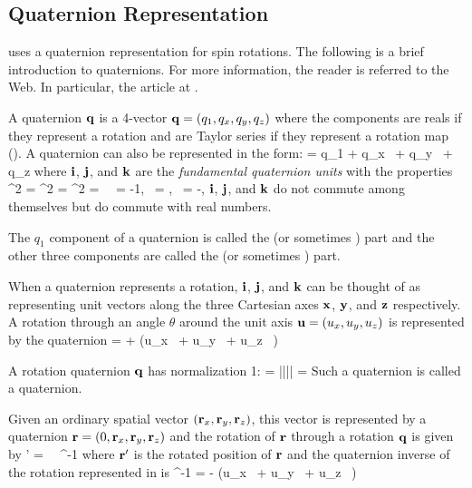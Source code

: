 \subsection{Quaternion Representation}
\label{s:quat}

\bmad uses a quaternion representation for spin rotations. The following is a brief introduction to
quaternions. For more information, the reader is referred to the Web. In particular, the
 article at . 

A quaternion ${\bf q}$ is a 4-vector ${\bf q} = (q_1, q_x, q_y, q_z)$ where the components are reals if they represent a
rotation and are Taylor series if they represent a rotation map (). A quaternion can
also be represented in the form:
\Begineq
  \bfq = q_1 + q_x \, \cali + q_y \, \calj + q_z \calk
\Endeq
where ${\bf i}$, ${\bf j}$, and ${\bf k}$ are the {\em fundamental quaternion units} with the properties
\Begineq
  \cali^2 = \calj^2 = \calk^2 = \cali \, \calj \, \calk = -1, \quad 
  \cali \, \calj = \calk, \quad \calj \, \cali = -\calk, \quad {}
\Endeq
${\bf i}$, ${\bf j}$, and ${\bf k}$ do not commute among themselves but do commute with real numbers.

The $q_1$ component of a quaternion is called the  (or sometimes ) part and the other
three components are called the  (or sometimes ) part.

When a quaternion represents a rotation, ${\bf i}$, ${\bf j}$, and ${\bf k}$ can be thought of as representing unit
vectors along the three Cartesian axes ${\bf x}$, ${\bf y}$, and ${\bf z}$ respectively. A rotation through an angle
$\theta$ around the unit axis ${\bf u} = (u_x, u_y, u_z)$ is represented by the quaternion
\Begineq
  \bfq = \cos{} + (u_x \, \cali + u_y \, \calj + u_z \, \calk) \sin{}
  \label{qt2ui}
\Endeq

A rotation quaternion ${\bf q}$ has normalization 1:
 = ||\bfq|| = 
\Endeq
Such a quaternion is called a  quaternion.

Given an ordinary spatial vector $({\bf r}_x, {\bf r}_y, {\bf r}_z)$, this vector is represented by a quaternion
${\bf r} = (0, {\bf r}_x, {\bf r}_y, {\bf r}_z)$ and the rotation of ${\bf r}$ through a rotation ${\bf q}$ is given by
\Begineq
  \bfr' = \bfq \, \bfr \, \bfq^{-1}
\Endeq
where ${\bf r}'$ is the rotated position of ${\bf r}$ and the quaternion inverse of the rotation
represented in  is
\Begineq
  \bfq^{-1} = \cos{} - (u_x \, \cali + u_y \, \calj + u_z \, \calk) \sin{}
\Endeq

